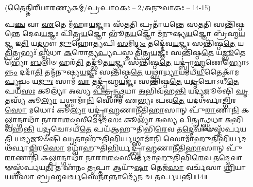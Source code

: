 \vspace{-1ex}
\centerline{\scriptsize(𑌤𑍈𑌤𑍍𑌤𑌿𑌰𑍀𑌯𑌾𑌰𑌣𑍍𑌯𑌕𑌮𑍍/𑌪𑍍𑌰𑌪𑌾𑌠𑌕𑌃 – 2/𑌅𑌨𑍁𑌵𑌾𑌕𑌃 – 14-15)}
{\normalsize
𑌪\-\ul{𑌞𑍍𑌚} 𑌵𑌾 \ul{𑌏}\-𑌤𑍇 𑌮᳴𑌹𑌾\-\ul{𑌯}\-𑌜𑍍𑌞𑌾𑌃 𑌸᳴\-\ul{𑌤}\-𑌤𑌿 𑌪𑍍𑌰𑌤𑌾᳴𑌯𑌨𑍍𑌤𑍇 𑌸\-\ul{𑌤}\-𑌤𑌿 𑌸𑌨𑍍𑌤𑌿᳴𑌷𑍍𑌠𑌨𑍍𑌤𑍇 𑌦𑍇𑌵\-\ul{𑌯}\-𑌜𑍍𑌞𑌃 𑌪𑌿᳴𑌤𑍃\-\ul{𑌯}\-𑌜𑍍𑌞𑍋 𑌭𑍂᳴𑌤\-\ul{𑌯}\-𑌜𑍍𑌞𑍋 𑌮᳴𑌨𑍁𑌷𑍍𑌯\-\ul{𑌯}\-𑌜𑍍𑌞𑍋 𑌬𑍍𑌰᳴𑌹𑍍𑌮\-\ul{𑌯}\-𑌜𑍍𑌞 𑌇\-\ul{𑌤𑌿} 𑌯\-\ul{𑌦}\-𑌗𑍍𑌨𑍗 \ul{𑌜𑍁}\-𑌹𑍋\-\ul{𑌤𑍍𑌯}\-𑌪𑌿 \ul{𑌸}\-𑌮𑌿\-\ul{𑌧𑌂} 𑌤𑌦𑍍𑌦𑍇᳴𑌵\-\ul{𑌯}\-𑌜𑍍𑌞𑌃 𑌸𑌨𑍍𑌤𑌿᳴𑌷𑍍𑌠\-\ul{𑌤𑍇} 𑌯\-\ul{𑌤𑍍𑌪𑌿}\-𑌤𑍃𑌭𑍍𑌯𑌃᳴ \ul{𑌸𑍍𑌵}\-𑌧𑌾 \ul{𑌕}\-𑌰𑍋𑌤𑍍𑌯\-\ul{𑌪𑍍𑌯}\-𑌪𑌸𑍍𑌤𑌤𑍍𑌪𑌿᳴𑌤𑍃\-\ul{𑌯}\-𑌜𑍍𑌞𑌃 𑌸𑌨𑍍𑌤𑌿᳴𑌷𑍍𑌠\-\ul{𑌤𑍇} 𑌯\-\ul{𑌦𑍍𑌭𑍂}\-𑌤𑍇𑌭𑍍𑌯𑍋᳴ \ul{𑌬}\-𑌲𑌿𑍞 𑌹𑌰᳴\-\ul{𑌤𑌿} 𑌤𑌦𑍍𑌭𑍂᳴𑌤\-\ul{𑌯}\-𑌜𑍍𑌞𑌃 𑌸𑌨𑍍𑌤𑌿᳴𑌷𑍍𑌠\-\ul{𑌤𑍇} 𑌯𑌦𑍍𑌬𑍍𑌰𑌾॑\-\ul{𑌹𑍍𑌮}\-𑌣𑍇𑌭𑍍𑌯𑍋𑌽\-\ul{𑌨𑍍𑌨𑌂} 𑌦𑌦𑌾᳴\-\ul{𑌤𑌿} 𑌤𑌨𑍍𑌮᳴𑌨𑍁𑌷𑍍𑌯\-\ul{𑌯}\-𑌜𑍍𑌞𑌃 𑌸𑌨𑍍𑌤𑌿᳴𑌷𑍍𑌠\-\ul{𑌤𑍇} 𑌯𑌥𑍍𑌸𑍍𑌵𑌾॑\-\ul{𑌧𑍍𑌯𑌾}\-𑌯𑌮𑌧𑍀᳴\-\ul{𑌯𑍀}\-𑌤𑍈𑌕𑌾᳴𑌮\-\ul{𑌪𑍍𑌯𑍃}\-𑌚𑌂 𑌯\-\ul{𑌜𑍁𑌃} 𑌸𑌾𑌮᳴ \ul{𑌵𑌾} 𑌤𑌦𑍍𑌬𑍍𑌰᳴𑌹𑍍𑌮\-\ul{𑌯}\-𑌜𑍍𑌞𑌃 𑌸𑌨𑍍𑌤𑌿᳴𑌷𑍍𑌠\-\ul{𑌤𑍇} 𑌯\-\ul{𑌦𑍃}\-𑌚𑍋𑌽𑌧𑍀᳴\-\ul{𑌤𑍇} 𑌪𑌯᳴\-\ul{𑌸𑌃} 𑌕𑍂𑌲𑍍𑌯𑌾᳴ 𑌅𑌸𑍍𑌯 \ul{𑌪𑌿}\-𑌤𑍄\-\ul{𑌨𑍍𑌥𑍍𑌸𑍍𑌵}\-𑌧𑌾 \ul{𑌅}\-𑌭𑌿𑌵᳴𑌹\-\ul{𑌨𑍍𑌤𑌿} 𑌯𑌦𑍍𑌯𑌜𑍂𑍞᳴𑌷𑌿 \ul{𑌘𑍃}\-𑌤𑌸𑍍𑌯᳴ 𑌕𑍂\-\ul{𑌲𑍍𑌯𑌾} 𑌯𑌥𑍍𑌸𑌾𑌮𑌾᳴\-\ul{𑌨𑌿} 𑌸𑍋𑌮᳴ 𑌏𑌭𑍍𑌯𑌃 𑌪𑌵\-\ul{𑌤𑍇} 𑌯𑌦𑌥᳴𑌰𑍍𑌵𑌾\-\ul{𑌙𑍍𑌗𑌿}\-𑌰\-\ul{𑌸𑍋} 𑌮𑌧𑍋𑌃॑ 𑌕𑍂\-\ul{𑌲𑍍𑌯𑌾} 𑌯𑌦𑍍𑌬𑍍𑌰𑌾॑\-\ul{𑌹𑍍𑌮}\-𑌣𑌾𑌨𑍀᳴𑌤𑌿\-\ul{𑌹𑌾}\-𑌸𑌾𑌨𑍍 𑌪𑍁᳴\-\ul{𑌰𑌾}\-𑌣𑌾\-\ul{𑌨𑌿} 𑌕\-\ul{𑌲𑍍𑌪𑌾}\-𑌨𑍍𑌗𑌾𑌥𑌾᳴ 𑌨𑌾𑌰𑌾\-\ul{𑌶}\-\-\ul{𑍞}\-𑌸𑍀𑌰𑍍𑌮𑍇𑌦᳴\-\ul{𑌸𑌃} 𑌕𑍂𑌲𑍍𑌯𑌾᳴ 𑌅𑌸𑍍𑌯 \ul{𑌪𑌿}\-𑌤𑍄\-\ul{𑌨𑍍𑌥𑍍𑌸𑍍𑌵}\-𑌧𑌾 \ul{𑌅}\-𑌭𑌿𑌵᳴𑌹\-\ul{𑌨𑍍𑌤𑌿} 𑌯\-\ul{𑌦𑍃}\-𑌚𑍋𑌽𑌧𑍀᳴\-\ul{𑌤𑍇} 𑌪𑌯᳴𑌆𑌹𑍁𑌤𑌿𑌭𑌿\-\ul{𑌰𑍇}\-𑌵 𑌤\-\ul{𑌦𑍍𑌦𑍇}\-𑌵𑌾𑍟𑌸𑍍𑌤᳴𑌰𑍍𑌪𑌯\-\ul{𑌤𑌿} 𑌯𑌦𑍍𑌯𑌜𑍂𑍞᳴𑌷𑌿 \ul{𑌘𑍃}\-𑌤𑌾𑌹𑍁᳴𑌤𑌿\-\ul{𑌭𑌿}\-𑌰𑍍𑌯𑌥𑍍𑌸𑌾𑌮𑌾᳴\-\ul{𑌨𑌿} 𑌸𑍋𑌮𑌾᳴𑌹𑍁𑌤𑌿\-\ul{𑌭𑌿}\-𑌰𑍍𑌯𑌦𑌥᳴𑌰𑍍𑌵𑌾\-\ul{𑌙𑍍𑌗𑌿}\-𑌰\-\ul{𑌸𑍋} 𑌮𑌧𑍍𑌵𑌾᳴\-𑌹𑍁𑌤𑌿\-\ul{𑌭𑌿}\-𑌰𑍍𑌯𑌦𑍍𑌬𑍍𑌰𑌾॑\-\ul{𑌹𑍍𑌮}\-𑌣𑌾𑌨𑍀᳴𑌤𑌿\-\ul{𑌹𑌾}\-𑌸𑌾𑌨𑍍 𑌪𑍁᳴\-\ul{𑌰𑌾}\-𑌣𑌾\-\ul{𑌨𑌿} 𑌕\-\ul{𑌲𑍍𑌪𑌾}\-𑌨𑍍𑌗𑌾𑌥𑌾᳴ 𑌨𑌾𑌰𑌾\-\ul{𑌶}\-\-\ul{𑍞}\-𑌸𑍀𑌰𑍍𑌮𑍇᳴𑌦𑌾\-\ul{𑌹𑍁}\-𑌤𑌿𑌭𑌿᳴\-\ul{𑌰𑍇}\-𑌵 𑌤\-\ul{𑌦𑍍𑌦𑍇}\-𑌵𑌾𑍟𑌸𑍍𑌤᳴𑌰𑍍𑌪𑌯\-\ul{𑌤𑌿} 𑌤 𑌏᳴𑌨𑌂 \ul{𑌤𑍃}\-𑌪𑍍𑌤𑌾 𑌆𑌯𑍁᳴\-\ul{𑌷𑌾} 𑌤𑍇𑌜᳴\-\ul{𑌸𑌾} 𑌵𑌰𑍍𑌚᳴𑌸𑌾 \ul{𑌶𑍍𑌰𑌿}\-𑌯𑌾 𑌯𑌶᳴𑌸𑌾 𑌬𑍍𑌰𑌹𑍍𑌮𑌵\-\ul{𑌰𑍍𑌚}\-𑌸𑍇\-\ul{𑌨𑌾}\-𑌨𑍍𑌨𑌾𑌦𑍍𑌯𑍇᳴𑌨 𑌚 𑌤𑌰𑍍𑌪𑌯𑌨𑍍𑌤𑌿॥14॥

}
